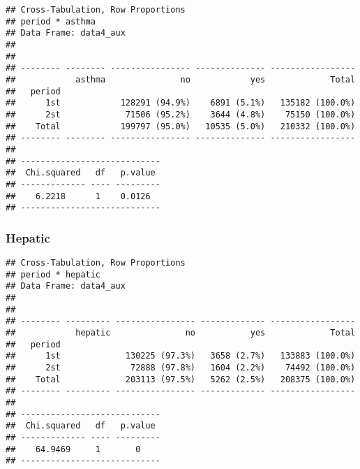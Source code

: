 \documentclass[
]{article}
\newenvironment{Shaded}{\begin{snugshade}}{\end{snugshade}}
\newcommand{\DataTypeTok}[1]{\textcolor[rgb]{0.13,0.29,0.53}{#1}}
\newcommand{\KeywordTok}[1]{\textcolor[rgb]{0.13,0.29,0.53}{\textbf{#1}}}
\newcommand{\NormalTok}[1]{#1}
\newcommand{\OperatorTok}[1]{\textcolor[rgb]{0.81,0.36,0.00}{\textbf{#1}}}
\newcommand{\OtherTok}[1]{\textcolor[rgb]{0.56,0.35,0.01}{#1}}
\newcommand{\StringTok}[1]{\textcolor[rgb]{0.31,0.60,0.02}{#1}}
\begin{document}
\begin{verbatim}
## Cross-Tabulation, Row Proportions  
## period * asthma  
## Data Frame: data4_aux  
## 
## 
## -------- -------- ---------------- -------------- -----------------
##            asthma               no            yes             Total
##   period                                                           
##      1st            128291 (94.9%)    6891 (5.1%)   135182 (100.0%)
##      2st             71506 (95.2%)    3644 (4.8%)    75150 (100.0%)
##    Total            199797 (95.0%)   10535 (5.0%)   210332 (100.0%)
## -------- -------- ---------------- -------------- -----------------
## 
## ----------------------------
##  Chi.squared   df   p.value 
## ------------- ---- ---------
##    6.2218      1    0.0126  
## ----------------------------
\end{verbatim}

\hypertarget{hepatic-1}{%
\subsubsection{Hepatic}\label{hepatic-1}}

\begin{Shaded}
\end{Shaded}

\begin{verbatim}
## Cross-Tabulation, Row Proportions  
## period * hepatic  
## Data Frame: data4_aux  
## 
## 
## -------- --------- ---------------- ------------- -----------------
##            hepatic               no           yes             Total
##   period                                                           
##      1st             130225 (97.3%)   3658 (2.7%)   133883 (100.0%)
##      2st              72888 (97.8%)   1604 (2.2%)    74492 (100.0%)
##    Total             203113 (97.5%)   5262 (2.5%)   208375 (100.0%)
## -------- --------- ---------------- ------------- -----------------
## 
## ----------------------------
##  Chi.squared   df   p.value 
## ------------- ---- ---------
##    64.9469     1       0    
## ----------------------------
\end{verbatim}
\end{document}
